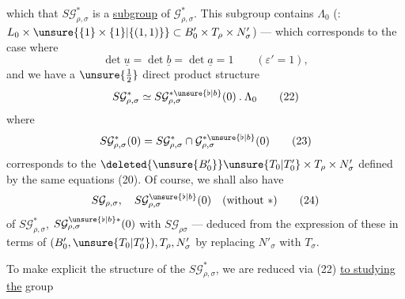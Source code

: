 
which  that $S\mathcal{G}_{\rho,\sigma}^{*}$ is  a \uline{subgroup}
of $\mathcal{G}_{\rho,\sigma}^{*}$. This subgroup contains $\Lambda_0$
(: $L_0\times\unsure{\{1\}\times\{1\}|\{(1,1)\}}\subset B'_0\times T_\rho\times N'_\sigma$) --- which
corresponds to the case where 
\[
\det\underline{u}=\det\underline{b}=\det\underline{a}=1\qquad(\varepsilon'=1),
\tag{21}
\]
and we have a $\unsure{\frac12}$ direct product structure
\[
S\mathcal{G}_{\rho,\sigma}^{*}\simeq S\mathcal{G}_{\rho,\sigma}^{*\unsure{\flat|b}}(0)\mathbin{.}\Lambda_0
\tag{22}
\]
where
\[
S\mathcal{G}_{\rho,\sigma}^{*}(0)=S\mathcal{G}_{\rho,\sigma}^{*}\cap\mathcal{G}_{\rho,\sigma}^{*\unsure{\flat|b}}(0)
\tag{23}
\]
corresponds to the   $\deleted{\unsure{B'_0}}\unsure{T_0|T'_0}\times T_\rho\times N'_\sigma$
 defined by the same equations
(20). Of course, we shall also have
\[
S\mathcal{G}_{\rho,\sigma},\quad S\mathcal{G}_{\rho,\sigma}^{\unsure{\flat|b}}(0)\quad(\text{without }*)
\tag{24}
\]
  of $S\mathcal{G}_{\rho,\sigma}^{*}$, $S\mathcal{G}_{\rho,\sigma}^{\unsure{\flat|b}*}(0)$ with
$S\mathcal{G}_{\rho\sigma}$ --- deduced from the expression
of these in terms of $(B'_0,\unsure{T_0|T'_0}),T_\rho,N'_\sigma$
by replacing $N'_\sigma$ with $T_\sigma$.

To make explicit the structure of the $S\mathcal{G}_{\rho,\sigma}^{*}$,
we are reduced via (22) \uline{to studying the}
group


